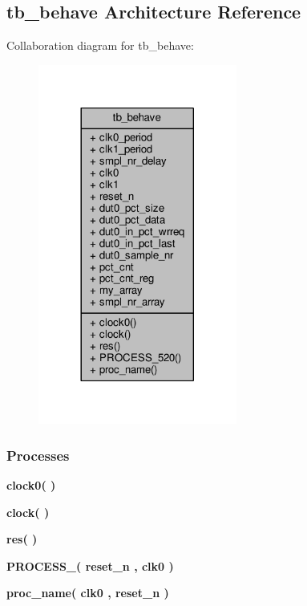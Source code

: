 \subsection{tb\+\_\+behave Architecture Reference}
\label{classpackets2data__tb_1_1tb__behave}


Collaboration diagram for tb\+\_\+behave\+:\nopagebreak
\begin{figure}[H]
\begin{center}
\leavevmode
\includegraphics[width=185pt]{d4/da0/classpackets2data__tb_1_1tb__behave__coll__graph}
\end{center}
\end{figure}
\subsubsection*{Processes}
 \begin{DoxyCompactItemize}
\item 
{\bf clock0}{\bfseries  (  )}
\item 
{\bf clock}{\bfseries  (  )}
\item 
{\bf res}{\bfseries  (  )}
\item 
{\bf P\+R\+O\+C\+E\+S\+S\+\_}{\bfseries  ( {\bfseries {\bfseries {\bf reset\+\_\+n}} \textcolor{vhdlchar}{ }} , {\bfseries {\bfseries {\bf clk0}} \textcolor{vhdlchar}{ }} )}
\item 
{\bf proc\+\_\+name}{\bfseries  ( {\bfseries {\bfseries {\bf clk0}} \textcolor{vhdlchar}{ }} , {\bfseries {\bfseries {\bf reset\+\_\+n}} \textcolor{vhdlchar}{ }} )}
\end{DoxyCompactItemize}

